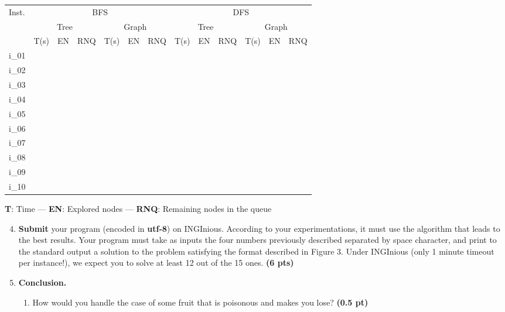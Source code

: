 \documentclass[11pt,a4paper]{../template/report}
\begin{document}
\begin{answers}[7cm]
\small
\begin{center}
\begin{tabular}{||l|l|l|l|l|l|l|l|l|l|l|l|l||}
\hline
\multirow{3}{*}{Inst.} & \multicolumn{6}{c|}{BFS} & \multicolumn{6}{c||}{DFS} \\
\cline{2-13}
& \multicolumn{3}{c|}{Tree} & \multicolumn{3}{c|}{Graph} & \multicolumn{3}{c|}{Tree} & \multicolumn{3}{c||}{Graph}\\
\cline{2-13}
 & T(s) & EN & RNQ & T(s) & EN & RNQ & T(s) & EN & RNQ & T(s) & EN & RNQ\\
\hline
i\_01 & & & & & & & & & & & & \\
\hline
i\_02 & & & & & & & & & & & & \\
\hline
i\_03 & & & & & & & & & & & & \\
\hline
i\_04 & & & & & & & & & & & & \\
\hline
i\_05 & & & & & & & & & & & & \\
\hline
i\_06 & & & & & & & & & & & & \\
\hline
i\_07 & & & & & & & & & & & & \\
\hline
i\_08 & & & & & & & & & & & & \\
\hline
i\_09 & & & & & & & & & & & & \\
\hline
i\_10 & & & & & & & & & & & & \\
\hline
\end{tabular}
\end{center}
\textbf{T}: Time — \textbf{EN}: Explored nodes —
\textbf{RNQ}: Remaining nodes in the queue
\end{answers}



\begin{enumerate}
\setcounter{enumi}{3}
    \item \textbf{Submit} your program (encoded in \textbf{utf-8}) on INGInious. According to your experimentations, it must use the algorithm that leads to the best results. Your program must take as inputs the four numbers previously described separated by space character, and print to the standard output a solution to the problem satisfying the format described in Figure 3. Under INGInious (only 1 minute timeout per instance!), we expect you to solve at least 12 out of the 15 ones. \textbf{(6 pts)}
\end{enumerate}

\begin{enumerate}
\setcounter{enumi}{4}
\item \textbf{Conclusion.}
\begin{enumerate}
        \item How would you handle the case of some fruit that is poisonous and makes
you lose?
\textbf{(0.5 pt)}
\end{enumerate}

\end{enumerate}
\end{document}
